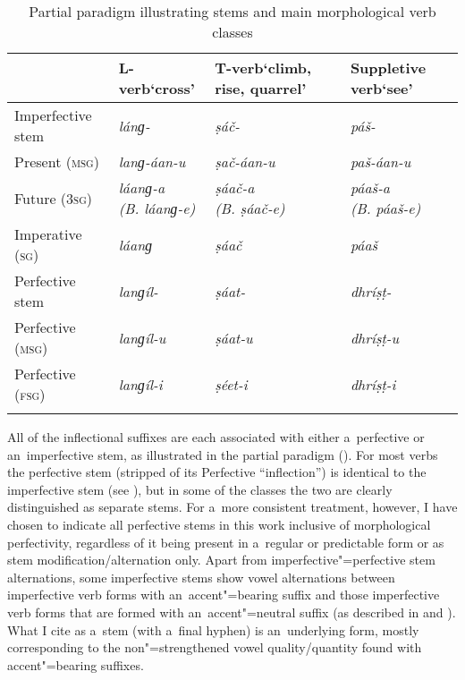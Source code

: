 \begin{table}[ht]
\caption{Partial paradigm illustrating stems and main morphological verb classes}

\begin{tabularx}{\textwidth}{ l P{20mm} Q P{27mm} }
\lsptoprule
& L-verb\newline `cross' &
T-verb\newline `climb, rise, quarrel' &
Suppletive verb\newline `see'\\\hline
Imperfective stem &
\textit{lánɡ-} &
\textit{ṣáč-} &
\textit{páš-} \\
Present (\textsc{msg}) &
\textit{lanɡ-áan-u} &
\textit{ṣač-áan-u} &
\textit{paš-áan-u} \\
Future (\textsc{3sg}) &
\textit{láanɡ-a\newline (B. láanɡ-e)} &
\textit{ṣáač-a\newline (B. ṣáač-e)} &
\textit{páaš-a\newline (B. páaš-e)} \\
Imperative (\textsc{sg}) &
\textit{láanɡ} &
\textit{ṣáač} &
\textit{páaš} \\
Perfective stem &
\textit{lanɡíl-} &
\textit{ṣáat-} &
\textit{dhríṣṭ-} \\
Perfective (\textsc{msg}) &
\textit{lanɡíl-u} &
\textit{ṣáat-u} &
\textit{dhríṣṭ-u} \\
Perfective (\textsc{fsg}) &
\textit{lanɡíl-i} &
\textit{ṣéet-i} &
\textit{dhríṣṭ-i} \\\lspbottomrule
\end{tabularx}
\label{tab:8-3}
\end{table}


All of the inflectional suffixes are each associated with either a~perfective or an~imperfective
stem, as illustrated in the partial paradigm (). For most verbs the perfective stem
(stripped of its Perfective ``inflection'') is identical to the imperfective stem (see ), but
in some of the classes the two are clearly distinguished as separate stems. For a~more consistent
treatment, however, I have chosen to indicate all perfective stems in this work inclusive of
morphological perfectivity, regardless of it being present in a~regular or predictable form or as
stem modification/alternation only. Apart from imperfective"=perfective stem alternations, some
imperfective stems show vowel alternations between imperfective verb forms with an~accent"=bearing
suffix and those imperfective verb forms that are formed with an~accent"=neutral suffix (as described
in  and ). What I cite as a~stem (with a~final hyphen) is an~underlying form, mostly
corresponding to the non"=strengthened vowel quality/quantity found with accent"=bearing suffixes.


